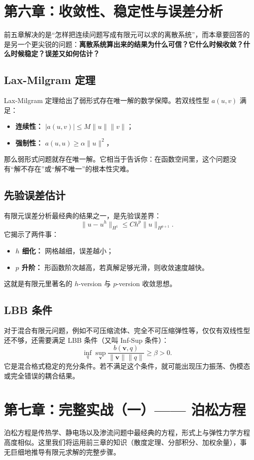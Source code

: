 \documentclass[11pt, a4paper, UTF8]{ctexart}
\begin{document}
\section{第六章：收敛性、稳定性与误差分析}
前五章解决的是“怎样把连续问题写成有限元可以求的离散系统”，而本章要回答的是另一个更尖锐的问题：\textbf{离散系统算出来的结果为什么可信？它什么时候收敛？什么时候稳定？误差又如何估计？}

\subsection{Lax-Milgram 定理}
Lax-Milgram 定理给出了弱形式存在唯一解的数学保障。若双线性型 $a(u,v)$ 满足：
\begin{itemize}
    \item \textbf{连续性：} $|a(u,v)| \le M \|u\| \|v\|$；
    \item \textbf{强制性：} $a(u,u) \ge \alpha \|u\|^2$，
\end{itemize}
那么弱形式问题就存在唯一解。它相当于告诉你：在函数空间里，这个问题没有“解不存在”或“解不唯一”的根本性灾难。

\subsection{先验误差估计}
有限元误差分析最经典的结果之一，是先验误差界：
\[
\| u - u^h \|_{H^1} \le C h^p \| u \|_{H^{p+1}}.
\]
它揭示了两件事：
\begin{itemize}
    \item \textbf{$h$ 细化：} 网格越细，误差越小；
    \item \textbf{$p$ 升阶：} 形函数阶次越高，若真解足够光滑，则收敛速度越快。
\end{itemize}
这就是有限元里著名的 $h$-version 与 $p$-version 收敛思想。

\subsection{LBB 条件}
对于混合有限元问题，例如不可压缩流体、完全不可压缩弹性等，仅仅有双线性型还不够，还需要满足 LBB 条件（又叫 Inf-Sup 条件）：
\[
\inf_{q} \sup_{\bm{v}} \frac{b(\bm{v}, q)}{\|\bm{v}\| \|q\|} \ge \beta > 0.
\]
它是混合格式稳定的充分条件。若不满足这个条件，就可能出现压力振荡、伪模态或完全错误的耦合结果。

\section{第七章：完整实战（一）—— 泊松方程}
泊松方程是传热学、静电场以及渗流问题中最经典的方程，形式上与弹性力学方程高度相似。这里我们将运用前三章的知识（散度定理、分部积分、加权余量），事无巨细地推导有限元求解的完整步骤。
\end{document}
